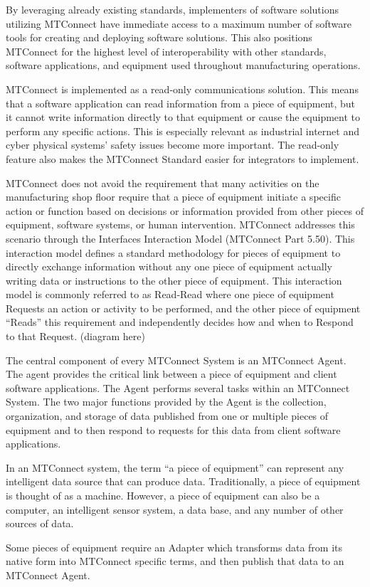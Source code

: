 By leveraging already existing standards, implementers of software solutions utilizing MTConnect have immediate access to a maximum number of software tools for creating and deploying software solutions.   This also positions MTConnect for the highest level of interoperability with other standards, software applications, and equipment used throughout manufacturing operations.    
 
MTConnect is implemented as a read-only communications solution.   This means that a software application can read information from a piece of equipment, but it cannot write information directly to that equipment or cause the equipment to perform any specific actions.  This is especially relevant as industrial internet and cyber physical systems’ safety issues become more important.  The read-only feature also makes the MTConnect Standard easier for integrators to implement. 
 
MTConnect does not avoid the requirement that many activities on the manufacturing shop floor require that a piece of equipment initiate a specific action or function based on decisions or information provided from other pieces of equipment, software systems, or human intervention.   MTConnect addresses this scenario through the Interfaces Interaction Model (MTConnect Part 5.50).   This interaction model defines a standard methodology for pieces of equipment to directly exchange information without any one piece of equipment actually writing data or instructions to the other piece of equipment.   This interaction model is commonly referred to as Read-Read where one piece of equipment Requests an action or activity to be performed, and the other piece of equipment “Reads” this requirement and independently decides how and when to Respond to that Request.  (diagram here)  

The central component of every MTConnect System is an MTConnect Agent.  The agent provides the critical link between a piece of equipment and client software applications.   The Agent performs several tasks within an MTConnect System.   The two major functions provided by the Agent is the collection, organization, and storage of data published from one or multiple pieces of equipment and to then respond to requests for this data from client software applications. 
 
In an MTConnect system, the term “a piece of equipment” can represent any intelligent data source that can produce data.  Traditionally, a piece of equipment is thought of as a machine.   However, a piece of equipment can also be a computer, an intelligent sensor system, a data base, and any number of other sources of data. 
 
Some pieces of equipment require an Adapter which transforms data from its native form into MTConnect specific terms, and then publish that data to an MTConnect Agent.    
